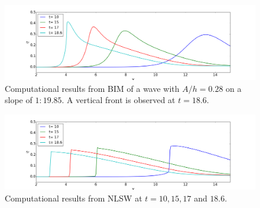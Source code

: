 \documentclass[review]{elsarticle}
\begin{document}
\begin{figure}[!htb]
\centering
\includegraphics[width=\textwidth]{_fig/bim_n7_time_series.png}
\caption{Computational results from BIM of a wave with $A/h=0.28$ 
on a slope of $1:19.85$.
A vertical front is observed at $t=18.6$. }
\label{fig:bim_breaking}
\end{figure}




\begin{figure}[!htb]
\centering
\includegraphics[width=\textwidth]{_fig/sw_dx05_time_series.png}
\caption{Computational results from NLSW at $t=10,15,17$ and $18.6$.}
\label{fig:sw_timeseries}
\end{figure}

\end{document}
